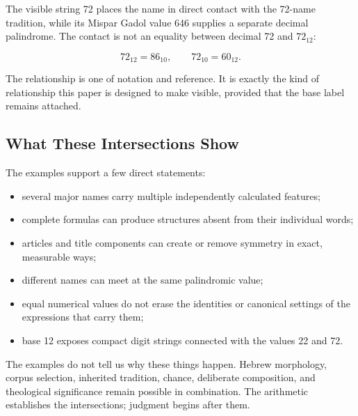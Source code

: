 The visible string 72 places the name in direct contact with the 72-name tradition, while its Mispar Gadol value 646 supplies a separate decimal palindrome. The contact is not an equality between decimal 72 and $72_{12}$:

\[
72_{12}=86_{10},
\qquad
72_{10}=60_{12}.
\]

The relationship is one of notation and reference. It is exactly the kind of relationship this paper is designed to make visible, provided that the base label remains attached.

\subsection{What These Intersections Show}

The examples support a few direct statements:

\begin{itemize}
\item several major names carry multiple independently calculated features;
\item complete formulas can produce structures absent from their individual words;
\item articles and title components can create or remove symmetry in exact, measurable ways;
\item different names can meet at the same palindromic value;
\item equal numerical values do not erase the identities or canonical settings of the expressions that carry them;
\item base 12 exposes compact digit strings connected with the values 22 and 72.
\end{itemize}

The examples do not tell us why these things happen. Hebrew morphology, corpus selection, inherited tradition, chance, deliberate composition, and theological significance remain possible in combination. The arithmetic establishes the intersections; judgment begins after them.
